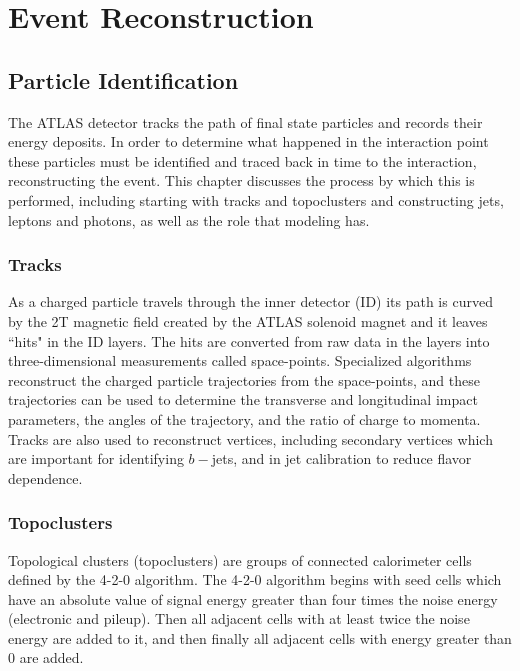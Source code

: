 \chapter{Event Reconstruction}
\label{ch:combinedPerformance}
\section{Particle Identification}

The ATLAS detector tracks the path of final state particles and records their energy deposits.  In order to determine what happened in the interaction point these particles must be identified and traced back in time to the interaction, reconstructing the event.  This chapter discusses the process by which this is performed, including starting with tracks and topoclusters and constructing jets, leptons and photons, as well as the role that modeling has.
\antikt\ 

\subsection{Tracks}

As a charged particle travels through the inner detector (ID) its path is curved by the 2T magnetic field created by the ATLAS solenoid magnet and it leaves ``hits" in the ID layers.  The hits are converted from raw data in the layers into three-dimensional measurements called space-points.  Specialized algorithms reconstruct the charged particle trajectories from the space-points, and these trajectories can be used to determine the transverse and longitudinal impact parameters, the angles of the trajectory, and the ratio of charge to momenta\cite{ATL-PHYS-PUB-2015-006}.  Tracks are also used to reconstruct vertices, including secondary vertices which are important for identifying $b-$jets, and in jet calibration to reduce flavor dependence\cite{jetsCalibrated}. 


\subsection{Topoclusters}

Topological clusters (topoclusters) are groups of connected calorimeter cells defined by the 4-2-0 algorithm\cite{slidingwindow}.  The 4-2-0 algorithm begins with seed cells which have an absolute value of signal energy greater than four times the noise energy (electronic and pileup).  Then all adjacent cells with at least twice the noise energy are added to it, and then finally all adjacent cells with energy greater than 0 are added.  \\

